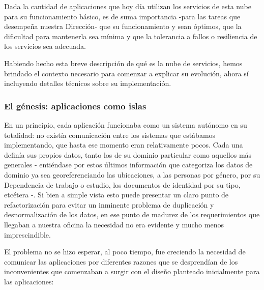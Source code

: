 Dada la cantidad de aplicaciones que hoy día utilizan los servicios de esta nube para su funcionamiento básico, es de suma importancia -para las tareas que desempeña nuestra Dirección- que su funcionamiento y  sean óptimos, que la dificultad para mantenerla sea mínima y que la tolerancia a fallos o resiliencia de los servicios sea adecuada.

Habiendo hecho esta breve descripción de qué es la nube de servicios, hemos brindado el contexto necesario para comenzar a explicar su evolución, ahora sí incluyendo detalles técnicos sobre su implementación.


\subsubsection{El génesis: aplicaciones como islas}
\label{nube:etapa0}

En un principio, cada aplicación funcionaba como un sistema autónomo en su totalidad: no existía comunicación entre los sistemas que estábamos implementando, que hasta ese momento eran relativamente pocos. Cada una definía sus propios datos, tanto los de su dominio particular como aquellos más generales - entiéndase por estos últimos información que categoriza los datos de dominio ya sea georeferenciando las ubicaciones, a las personas por género, por su Dependencia de trabajo o estudio, los documentos de identidad por su tipo, etcétera -. Si bien a simple vista esto puede presentar un claro punto de refactorización para evitar un inminente problema de duplicación y desnormalización de los datos, en ese punto de madurez de los requerimientos que llegaban a nuestra oficina la necesidad no era evidente y mucho menos imprescindible.

El problema no se hizo esperar, al poco tiempo, fue creciendo la necesidad de comunicar las aplicaciones por diferentes razones que se desprendían de los inconvenientes que comenzaban a surgir con el diseño planteado inicialmente para las aplicaciones:

